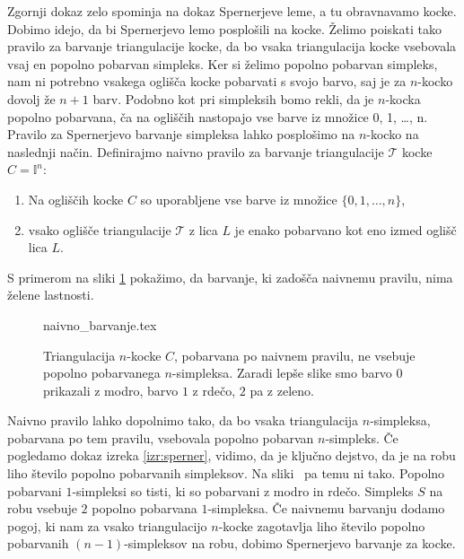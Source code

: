 \documentclass[mat1]{fmfdelo}
\newcommand{\I}{\mathbb I}
\newcommand{\0}{0}
\newcommand{\pT}{\mathcal T}
\begin{document}
Zgornji dokaz zelo spominja na dokaz Spernerjeve leme, a tu obravnavamo kocke. Dobimo idejo, da bi Spernerjevo lemo posplošili na kocke. Želimo poiskati tako pravilo za barvanje triangulacije kocke, da bo vsaka triangulacija kocke vsebovala vsaj en popolno pobarvan simpleks. Ker si želimo popolno pobarvan simpleks, nam ni potrebno vsakega oglišča kocke pobarvati s svojo barvo, saj je za $n$-kocko dovolj že $n+1$ barv. Podobno kot pri simpleksih bomo rekli, da je $n$-kocka popolno pobarvana, ča na ogliščih nastopajo vse barve iz množice {0, 1, \dots, n}.  Pravilo za Spernerjevo barvanje simpleksa lahko posplošimo na $n$-kocko na naslednji način.
Definirajmo naivno pravilo za barvanje triangulacije $\pT$ kocke $C=\I^n$:
\begin{enumerate}
\item Na ogliščih kocke $C$ so uporabljene vse barve iz množice $\{0, 1, \dots, n \}$,
\item vsako oglišče triangulacije $\pT$ z lica $L$ je enako pobarvano kot eno izmed oglišč lica $L$.
\end{enumerate}
S primerom na sliki \ref{fig:ni-pop} pokažimo, da barvanje, ki zadošča naivnemu pravilu, nima želene lastnosti.
\begin{figure}[h!]
	\centering
	{naivno_barvanje.tex}
	\caption{Triangulacija $n$-kocke $C$, pobarvana po naivnem pravilu, ne vsebuje popolno pobarvanega $n$-simpleksa. Zaradi lepše slike smo barvo $0$ prikazali z modro, barvo $1$ z rdečo, $2$ pa z zeleno.}\label{fig:ni-pop}
\end{figure}
Naivno pravilo lahko dopolnimo tako, da bo vsaka triangulacija $n$-simpleksa, pobarvana po tem pravilu, vsebovala popolno pobarvan $n$-simpleks. Če pogledamo dokaz izreka \ref{izr:sperner}, vidimo, da je ključno dejstvo, da je na robu liho število popolno pobarvanih simpleksov. Na sliki~\label{fig:ni-pop} pa temu ni tako. Popolno pobarvani $1$-simpleksi so tisti, ki so pobarvani z modro in rdečo. Simpleks $S$ na robu vsebuje $2$ popolno pobarvana $1$-simpleksa. Če naivnemu barvanju dodamo pogoj, ki nam za vsako triangulacijo $n$-kocke zagotavlja liho število popolno pobarvanih $(n-1)$-simpleksov na robu, dobimo Spernerjevo barvanje za kocke.
\end{document}
